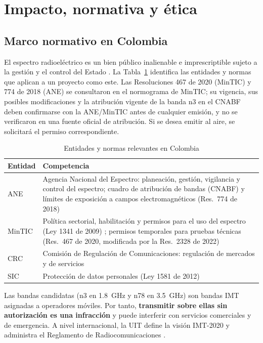 \documentclass[conference]{IEEEtran}
\begin{document}
\section{Impacto, normativa y ética}
\label{sec:etica}

\subsection{Marco normativo en Colombia}
El espectro radioeléctrico es un bien público inalienable e imprescriptible sujeto a la gestión y el control del Estado \cite{constitucion}. La Tabla~\ref{tab:entes} identifica las entidades y normas que aplican a un proyecto como este. Las Resoluciones 467 de 2020 (MinTIC) y 774 de 2018 (ANE) se consultaron en el normograma de MinTIC; su vigencia, sus posibles modificaciones y la atribución vigente de la banda n3 en el CNABF deben confirmarse con la ANE/MinTIC antes de cualquier emisión, y no se verificaron en una fuente oficial de atribución. Si se desea emitir al aire, se solicitará el permiso correspondiente.

\begin{table}[!t]
\caption{Entidades y normas relevantes en Colombia}
\label{tab:entes}
\centering
\footnotesize
\renewcommand{\arraystretch}{1.15}
\begin{tabular}{p{1.7cm}p{6.0cm}}
\toprule
\textbf{Entidad} & \textbf{Competencia} \\
\midrule
ANE & Agencia Nacional del Espectro: planeación, gestión, vigilancia y control del espectro; cuadro de atribución de bandas (CNABF) y límites de exposición a campos electromagnéticos (Res.~774 de 2018) \cite{ane774} \\
MinTIC & Política sectorial, habilitación y permisos para el uso del espectro (Ley 1341 de 2009) \cite{ley1341}; permisos temporales para pruebas técnicas (Res.~467 de 2020, modificada por la Res.~2328 de 2022) \cite{res467} \\
CRC & Comisión de Regulación de Comunicaciones: regulación de mercados y de servicios \\
SIC & Protección de datos personales (Ley 1581 de 2012) \cite{ley1581} \\
\bottomrule
\end{tabular}
\end{table}

Las bandas candidatas (n3 en 1.8~GHz y n78 en 3.5~GHz) son bandas IMT asignadas a operadores móviles. Por tanto, \textbf{transmitir sobre ellas sin autorización es una infracción} y puede interferir con servicios comerciales y de emergencia. A nivel internacional, la UIT define la visión IMT-2020 y administra el Reglamento de Radiocomunicaciones \cite{itum2083}.
\end{document}
